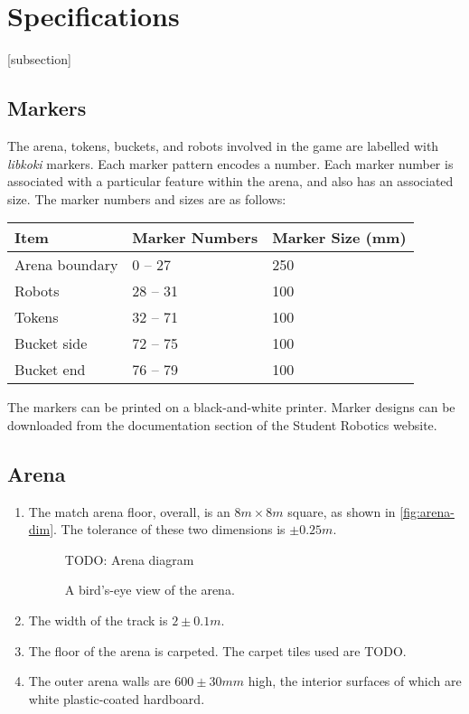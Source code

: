 \section{Specifications}
\label{sec:Specifications}

[subsection]
\newcommand{\rcnii}{\stepcounter{rulei}\arabic{section}.\arabic{subsection}.\arabic{rulei}}
\renewcommand{\labelenumi}{\rcnii}

\subsection{Markers}
\label{sub:markers}
The arena, tokens, buckets, and robots involved in the game are labelled with \textit{libkoki} markers.  Each marker pattern encodes a number.  Each marker number is associated with a particular feature within the arena, and also has an associated size.  The marker numbers and sizes are as follows:

\begin{center}
  \begin{tabular}{lll}
    \toprule
    \textbf{Item} & \textbf{Marker Numbers} & \textbf{Marker Size (mm)} \\
    \midrule
    Arena boundary & 0 -- 27 & 250 \\
    Robots & 28 -- 31 & 100 \\
    Tokens & 32 -- 71 & 100 \\
    Bucket side & 72 -- 75 & 100 \\
    Bucket end & 76 -- 79 & 100 \\
    \bottomrule
  \end{tabular}
\end{center}

The markers can be printed on a black-and-white printer.  Marker designs can be downloaded from the documentation section of the Student Robotics website.

\subsection{Arena}
\label{sub:arena}
\begin{enumerate}
\item The match arena floor, overall, is an $8m \times 8m$ square, as shown in \autoref{fig:arena-dim}.
 The tolerance of these two dimensions is $\pm0.25m$.

\begin{figure}
  TODO: Arena diagram
  \caption{\label{fig:arena-dim}A bird's-eye view of the arena.}
\end{figure}

\item The width of the track is $2\pm0.1m$.
\item The floor of the arena is carpeted.  The carpet tiles used are TODO.
\item The outer arena walls are $600\pm30mm$ high, the interior surfaces of which are white plastic-coated hardboard.
\end{enumerate}

